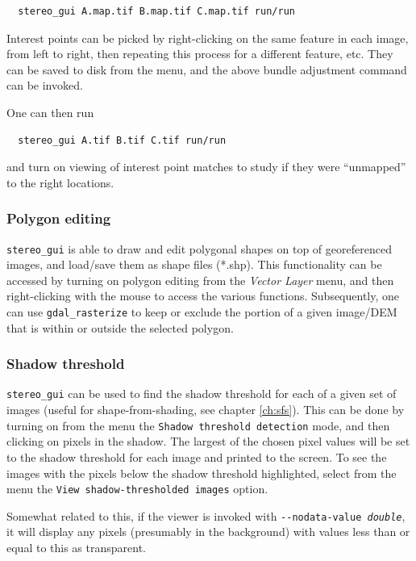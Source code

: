 \begin{verbatim}
  stereo_gui A.map.tif B.map.tif C.map.tif run/run
\end{verbatim}

Interest points can be picked by right-clicking on the same feature
in each image, from left to right, then repeating this process for 
a different feature, etc. They can be saved to disk from the menu,
and the above bundle adjustment command can be invoked.

One can then run
\begin{verbatim}
  stereo_gui A.tif B.tif C.tif run/run
\end{verbatim}

and turn on viewing of interest point matches to study if they were
``unmapped'' to the right locations.

\subsubsection{Polygon editing}

\texttt{stereo\_gui} is able to draw and edit polygonal shapes on top of
georeferenced images, and load/save them as shape files (*.shp).  This
functionality can be accessed by turning on polygon editing from the
\textit{Vector Layer} menu, and then right-clicking with the mouse to
access the various functions. Subsequently, one can use
\texttt{gdal\_rasterize} to keep or exclude the portion of a given
image/DEM that is within or outside the selected polygon.

\subsubsection{Shadow threshold}
\texttt{stereo\_gui} can be used to find the shadow threshold for each
of a given set of images (useful for shape-from-shading, see chapter \ref{ch:sfs}).
This can be done by turning on from the menu
the \texttt{Shadow threshold detection} mode, and then clicking on
pixels in the shadow. The largest of the chosen pixel values will be set
to the shadow threshold for each image and printed to the screen. To see
the images with the pixels below the shadow threshold highlighted,
select from the menu the \texttt{View shadow-thresholded images} option.

Somewhat related to this, if the viewer is invoked with
\texttt{-\/-nodata-value \textit{double}}, it will display any
pixels (presumably in the background) with values less than or equal to
this as transparent.


